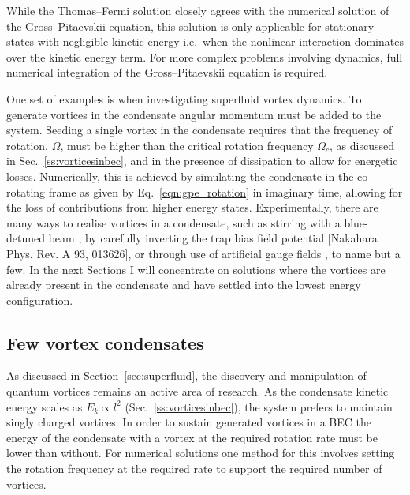 While the Thomas--Fermi solution closely agrees with the numerical solution of the Gross--Pitaevskii equation, this solution is only applicable for stationary states with negligible kinetic energy i.e.~when the nonlinear interaction dominates over the kinetic energy term. For more complex problems involving dynamics, full numerical integration of the Gross--Pitaevskii equation is required.

One set of examples is when investigating superfluid vortex dynamics. To generate vortices in the condensate angular momentum must be added to the system. Seeding a single vortex in the condensate requires that the frequency of rotation, $\Omega$, must be higher than the critical rotation frequency $\Omega_c$, as discussed in Sec.~\ref{ss:vorticesinbec}, and in the presence of dissipation to allow for energetic losses. Numerically, this is achieved by simulating the condensate in the co-rotating frame as given by Eq.~\ref{eqn:gpe_rotation} in imaginary time, allowing for the loss of contributions from higher energy states. Experimentally, there are many ways to realise vortices in a condensate, such as stirring with a blue-detuned beam \cite{Vtx:Raman_prl_2001}, by carefully inverting the trap bias field potential \cite{Vtx:Kawaguchi_pra_2004}[Nakahara Phys. Rev. A 93, 013626], or through use of artificial gauge fields \cite{AO:Dalibard_rmp_2011}, to name but a few. In the next Sections I will concentrate on solutions where the vortices are already present in the condensate and have settled into the lowest energy configuration.


\subsection{Few vortex condensates}

As discussed in Section~\ref{sec:superfluid}, the discovery and manipulation of quantum vortices remains an active area of research. As the condensate kinetic energy scales as $E_k \propto l^2$ (Sec.~\ref{ss:vorticesinbec}), the system prefers to maintain singly charged vortices. In order to sustain generated vortices in a BEC the energy of the condensate with a vortex at the required rotation rate must be lower than without. For numerical solutions one method for this involves setting the rotation frequency at the required rate to support the required number of vortices.

